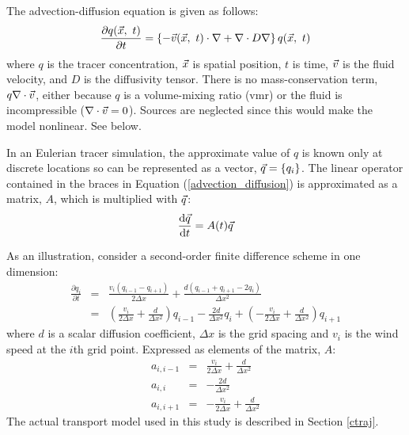 The advection-diffusion equation is given as follows:
\begin{equation}
\frac{\partial q(\vec x, ~ t)}{\partial t} = \left \lbrace -\vec v(\vec x, ~t) \cdot \nabla + \nabla \cdot D \nabla \right \rbrace q(\vec x, ~ t)
\label{advection_diffusion}
\end{equation}
where $q$ is the tracer concentration, $\vec x$ is spatial position, 
$t$ is time, $\vec v$ is the fluid velocity, and $D$ is the diffusivity tensor.
There is no mass-conservation term, $q \nabla \cdot \vec v$,
either because $q$ is a volume-mixing ratio (vmr) or 
the fluid is incompressible ($\nabla \cdot \vec v = 0$).
Sources are neglected since this would make the model nonlinear.
See below.

In an Eulerian tracer simulation, the approximate value of $q$
is known only at discrete locations so can be represented as a vector,
$\vec q=\lbrace q_i \rbrace$.
The linear operator 
contained in the braces in Equation (\ref{advection_diffusion}) 
is approximated as a matrix, $A$, which is multiplied with $\vec q$:
\begin{equation}
\frac{\mathrm d \vec q}{\mathrm d t} = A(t) \vec q
\label{linear_ODE}
\end{equation}

As an illustration, consider a second-order finite difference scheme in one dimension:
\begin{eqnarray}
\frac{\partial q_i}{\partial t} & = & \frac{v_i (q_{i-1} - q_{i+1})}{2 \Delta x} +
	\frac{d (q_{i-1} + q_{i+1} - 2 q_i)}{\Delta x^2} 
	\label{finite_difference_diffusion}
	\\\nonumber
& = & \left (\frac{v_i}{2 \Delta x} + \frac{d}{\Delta x^2} \right ) q_{i-1} -
	\frac{2 d}{\Delta x^2} q_i 
	+ \left (- \frac{v_i}{2 \Delta x} + \frac{d}{\Delta x^2} \right ) q_{i+1} 
\end{eqnarray}
where $d$ is a scalar diffusion coefficient, $\Delta x$ is the grid spacing
and $v_i$ is the wind speed at the $i$th grid point.
Expressed as elements of the matrix, $A$:
\begin{eqnarray}
a_{i,i-1} & = & \frac{v_i}{2 \Delta x} + \frac{d}{\Delta x^2} \\\nonumber
	a_{i,i} & = & -\frac{2 d}{\Delta x^2} \\\nonumber
a_{i,i+1} & = & - \frac{v_i}{2 \Delta x} + \frac{d}{\Delta x^2}
\end{eqnarray}
The actual transport model used in this study is described in Section 
\ref{ctraj}.

